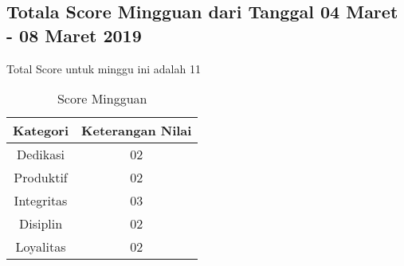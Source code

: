 \subsection{Totala Score Mingguan dari Tanggal 04 Maret - 08 Maret 2019}
Total Score untuk minggu ini adalah 11

\begin{table}[h]
\caption{Score Mingguan}
\centering
\begin{tabular}{|c|c|}
\hline
\textbf{Kategori}&\textbf{Keterangan Nilai}\\
\hline
Dedikasi&02\\
\hline
Produktif&02\\
\hline
Integritas&03\\
\hline
Disiplin&02\\
\hline
Loyalitas&02\\
\hline
\end{tabular}
\label{table:score mingguan}
\end{table}

